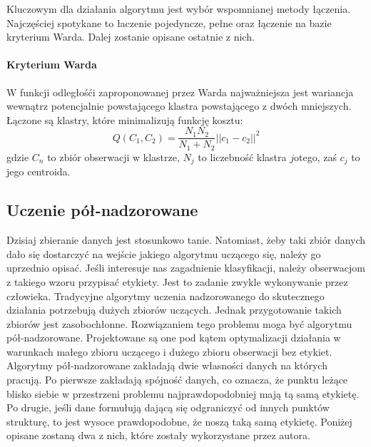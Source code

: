 \documentclass{article}
\begin{document}
Kluczowym dla działania algorytmu jest wybór wspomnianej metody łączenia.
Najczęściej spotykane to łaczenie pojedyncze, pełne oraz łączenie na bazie kryterium Warda. 
Dalej zostanie opisane ostatnie z nich.


\paragraph{Kryterium Warda}
W funkcji odległośći zaproponowanej przez Warda najważniejsza jest wariancja wewnątrz potencjalnie powstającego klastra powstającego z dwóch mniejszych.
Łączone są klastry, które minimalizują funkcję kosztu:
\[ Q(C_1, C_2) = \frac{N_1N_2}{N_1 + N_2}||c_1 - c_2||^2 \]
gdzie $C_n$ to zbiór obserwacji w klastrze, $N_j$ to liczebność klastra $j$otego, zaś $c_j$ to jego centroida.

\subsection{Uczenie pół-nadzorowane}
Dzisiaj zbieranie danych jest stosunkowo tanie.
Natomiast, żeby taki zbiór danych dało się dostarczyć na wejście jakiego algorytmu uczącego się, należy go uprzednio opisać.
Jeśli interesuje nas zagadnienie klasyfikacji, należy obserwacjom z takiego wzoru przypisać etykiety.
Jest to zadanie zwykle wykonywanie przez człowieka.
Tradycyjne algorytmy uczenia nadzorowanego do skutecznego działania potrzebują dużych zbiorów uczących. 
Jednak przygotowanie takich zbiorów jest zasobochłonne.
Rozwiązaniem tego problemu moga być algorytmu pół-nadzorowane.
Projektowane są one pod kątem optymalizacji działania w warunkach małego zbioru uczącego i dużego zbioru obserwacji bez etykiet.
Algorytmy pół-nadzorowane zakładają dwie własności danych na których pracują.
Po pierwsze zakładają spójność danych, co oznacza, że punktu leżące blisko siebie w przestrzeni problemu najprawdopodobniej mają tą samą etykietę.
Po drugie, jeśli dane formułują dającą się odgraniczyć od innych punktów strukturę, to jest wysoce prawdopodobne, że noszą taką samą etykietę\cite{Zhou2004}.
Poniżej opisane zostaną dwa z nich, które zostały wykorzystane przez autora.
\end{document}
